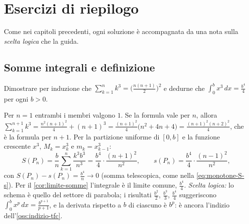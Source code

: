 \section{Esercizi di riepilogo}
\label{sec:esercizi-cap8}

Come nei capitoli precedenti, ogni soluzione è accompagnata da una nota sulla
\emph{scelta logica} che la guida.

\subsection*{Somme integrali e definizione}

\begin{esercizio}\label{es:integrale-x3}
Dimostrare per induzione che $\sum_{k=1}^{n}k^{3}=\bigl(\frac{n(n+1)}2\bigr)^{2}$ e dedurne
che $\int_{0}^{b}x^{3}\,dx=\frac{b^{4}}4$ per ogni $b>0$.
\begin{soluzione}
Per $n=1$ entrambi i membri valgono $1$. Se la formula vale per $n$, allora
$\sum_{k=1}^{n+1}k^{3}=\frac{n^{2}(n+1)^{2}}4+(n+1)^{3}=\frac{(n+1)^{2}}4\bigl(n^{2}+4n+4\bigr)
=\frac{(n+1)^{2}(n+2)^{2}}4$, che è la formula per $n+1$. Per la partizione uniforme di
$[0,b]$ e la funzione crescente $x^{3}$, $M_{k}=x_{k}^{3}$ e $m_{k}=x_{k-1}^{3}$:
\[
  S(P_{n})=\frac bn\sum_{k=1}^{n}\frac{k^{3}b^{3}}{n^{3}}=\frac{b^{4}}4\cdot\frac{(n+1)^{2}}{n^{2}},
  \qquad
  s(P_{n})=\frac{b^{4}}4\cdot\frac{(n-1)^{2}}{n^{2}} ,
\]
con $S(P_{n})-s(P_{n})=\frac{b^{4}}n\to0$ (somma telescopica, come nella
\eqref{eq:monotone-S-s}). Per il \cref{cor:limite-somme} l'integrale è il limite comune,
$\frac{b^{4}}4$. \emph{Scelta logica:} lo schema è quello del settore di parabola; i
risultati $\frac{b^{2}}2$, $\frac{b^{3}}3$, $\frac{b^{4}}4$ suggeriscono
$\int_{0}^{b}x^{p}\,dx=\frac{b^{p+1}}{p+1}$, e la derivata rispetto a $b$ di ciascuno è
$b^{p}$: è ancora l'indizio dell'\cref{oss:indizio-tfc}.
\end{soluzione}
\end{esercizio}

